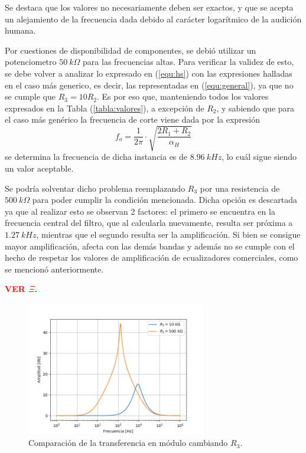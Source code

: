 Se destaca que los valores no necesariamente deben ser exactos, y que se acepta un alejamiento de la frecuencia dada debido al carácter logarítmico de la audición humana.

Por cuestiones de disponibilidad de componentes, se debió utilizar un potenciometro $50 \ k\Omega$ para las frecuencias altas. Para verificar la validez de esto, se debe volver a analizar lo expresado en (\ref{equ:hs}) con las expresiones halladas en el caso más generico, es decir, las representadas en (\ref{equ:general}), ya que no se cumple que $R_3 = 10R_2$. Es por eso que, manteniendo todos los valores expresados en la Tabla (\ref{tabla:valores}), a excepción de $R_2$, y sabiendo que para el caso más genérico la frecuencia de corte viene dada por la expresión
\begin{equation}
	f_o = \frac{1}{2\pi} \cdot \sqrt{\frac{2R_1 + R_2}{\alpha_H}}
	\label{equ:fogeneral}
\end{equation}
se determina la frecuencia de dicha instancia es de $8.96 \ kHz$, lo cuál sigue siendo un valor aceptable.

Se podría solventar dicho problema reemplazando $R_3$ por una resistencia de $500 \ k\Omega$ para poder cumplir la condición mencionada. Dicha opción es descartada ya que al realizar esto se observan 2 factores: el primero se encuentra en la frecuencia central del filtro, que al calcularla nuevamente, resulta ser próxima a $1.27 \ kHz$, mientras que el segundo resulta ser la amplificación. Si bien se consigue mayor amplificación, afecta con las demás bandas y además no se cumple con el hecho de respetar los valores de amplificación de ecualizadores comerciales, como se mencionó anteriormente.

\begin{center}
	\textcolor{red}{\textbf{VER $\Xi$.}}
\end{center}

\begin{figure}[H]
\centering
	\includegraphics[width=0.7\textwidth]{Imagenes/r3comp.png}
	\caption{Comparación de la transferencia en módulo cambiando $R_3$.}
	\label{fig:r3comp}
\end{figure}

